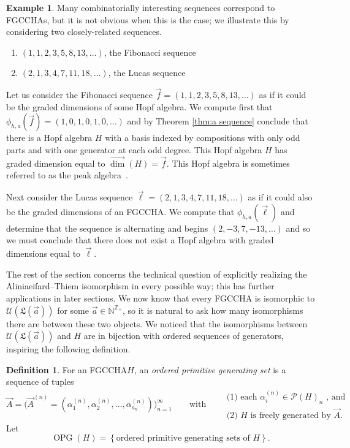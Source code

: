 \documentclass[11pt]{amsart}
\theoremstyle{definition}
\newtheorem{definition}[theorem]{Definition}
\newtheorem{example}[theorem]{Example}
\numberwithin{equation}{section}
\def\NN{{\mathbb N}}
\def\ZZ{{\mathbb Z}}
\newcommand{\FGCCHA}{\textsf{FGCCHA}\xspace}
\newcommand{\FGCCHAs}{\textsf{FGCCHA}s\xspace}
\newcommand{\vecdim}{\overrightarrow{\dim}}
\newcommand{\OPG}{\operatorname{OPG}}
\newcommand{\lucas}[1]{\todo[size=\tiny,color=red!50]{#1 \\ \hfill --- Lucas}}
\begin{document}
\begin{example}
Many combinatorially interesting sequences correspond to \FGCCHAs, but it is not obvious when this is the case; we illustrate this by considering two closely-related sequences.
\begin{enumerate}
\item $(1,1,2,3,5,8,13,\ldots)$, the Fibonacci sequence

\item $(2,1,3,4,7,11,18,\ldots)$, the Lucas sequence
\end{enumerate}
Let us consider the Fibonacci sequence $\vec{f} = (1,1,2,3,5,8,13,\ldots)$
as if it could be the graded dimensions of some Hopf algebra.
We compute first that $\phi_{h,a}(\vec{f}) = (1,0,1,0,1,0,\ldots)$
and by Theorem \ref{thm:a sequence} conclude
that there is a Hopf algebra $H$ with a basis indexed by
compositions with only odd parts and with one generator at each odd degree.
This Hopf algebra $H$ has graded dimension equal to $\vecdim(H) = \vec{f}$.
This Hopf algebra is sometimes referred to as the peak algebra~\cite[\S 2]{Bergeron_2002}.

Next consider the Lucas sequence $\vec{\ell} = (2,1,3,4,7,11,18,\ldots)$
as if it could also be the graded dimensions of an \FGCCHA.  We compute that $\phi_{h,a}(\vec{\ell})$ and determine
that the sequence is alternating and begins $(2, -3, 7, -13,\ldots)$ and so we must conclude
that there does not exist a Hopf algebra with graded dimensions equal to $\vec{\ell}$.
\end{example}

The rest of the section concerns the technical question of explicitly realizing the Aliniaeifard--Thiem isomorphism in every possible way; this has further applications in later sections.  
We now know that every \FGCCHA is isomorphic to $\mathcal{U}(\mathfrak{L}(\vec{a}))$ for some $\vec{a} \in \NN^{\ZZ_{+}}$, so it is natural to ask how many isomorphisms there are between these two objects.  
We noticed that the isomorphisms between $\mathcal{U}(\mathfrak{L}(\vec{a}))$ and $H$ are in bijection with ordered sequences of generators, inspiring the following definition.

\begin{definition}
\label{def:OPG}
For an \FGCCHA $H$, an \emph{ordered primitive generating set} is a sequence of tuples
\[
\vec{A} = \Big(\vec{A}^{(n)} = (\alpha_{1}^{(n)}, \alpha_{2}^{(n)}, \ldots, \alpha_{a_{n}}^{(n)})\Big)_{n = 1}^{\infty}
\qquad\text{with}\qquad
\begin{array}{l}
\text{(1) each $\alpha_{i}^{(n)} \in \mathcal{P}(H)_{n}$ , and} \\
\text{(2) $H$ is freely generated by $\vec{A}$.}
\end{array}
\]
Let
\[
\OPG(H) = \left\{ \text{ordered primitive generating sets of $H$} \right\}.
\]
\end{definition}
\end{document}

